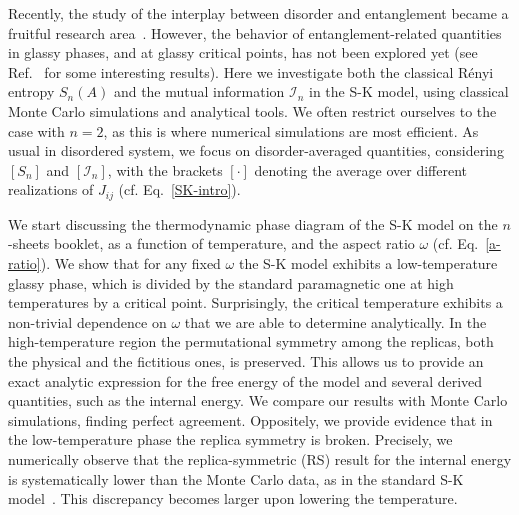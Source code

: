 \documentclass[twocolumn,superscriptaddress,prb,10pt]{revtex4-1}
\begin{document}
Recently, the study of the interplay between disorder and entanglement became a fruitful 
research area~\cite{refael-2009}. However, the behavior of entanglement-related quantities 
in glassy phases, and at glassy critical points, has not been explored yet (see 
Ref.~ for some interesting results). Here we investigate 
both the classical R\'enyi entropy $S_n(A)$ and the mutual information ${\mathcal I}_n$ 
in the S-K model, using classical Monte Carlo simulations and analytical tools. We often 
restrict ourselves to the case with $n=2$, as this is where numerical simulations are 
most efficient. As usual in disordered system, we focus on disorder-averaged quantities, 
considering $[S_n]$ and $[{\mathcal I}_n]$, with the brackets $[\cdot]$ denoting the 
average over different realizations of $J_{ij}$ (cf. Eq.~\eqref{SK-intro}).

We start discussing the thermodynamic phase diagram of the S-K model on the $n$-sheets 
booklet, as a function of temperature, and the aspect ratio $\omega$ (cf. Eq.~\eqref{a-ratio}). 
We show that for any fixed $\omega$ the S-K model exhibits a low-temperature glassy phase, 
which is divided by the standard paramagnetic one at high temperatures by a critical point. 
Surprisingly, the critical temperature exhibits a non-trivial dependence on $\omega$ 
that we are able to determine analytically. 
In the high-temperature region the permutational symmetry among the replicas, both the 
physical and the fictitious ones, is preserved. This allows us to provide an exact analytic 
expression for the free energy of the model and several derived quantities, such as the internal 
energy. We compare our results with Monte Carlo simulations, finding perfect agreement. 
Oppositely, we provide evidence that in the low-temperature phase the replica symmetry is  
broken. Precisely, we numerically observe that the replica-symmetric (RS) result for the 
internal energy  is systematically lower than the Monte Carlo data, as in the standard 
S-K model~\cite{sherrington-1978-prl,sherrington-1978}. This discrepancy becomes larger 
upon lowering the temperature.  
\end{document}
